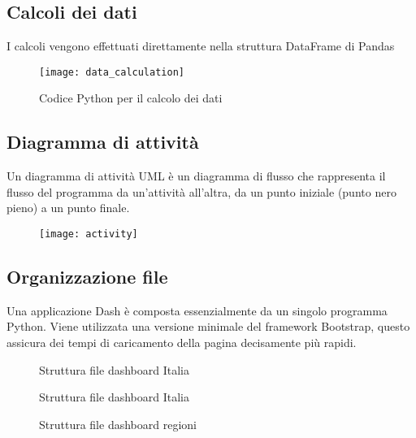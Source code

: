 \subsection{Calcoli dei dati}
I calcoli vengono effettuati direttamente nella struttura DataFrame di Pandas
\begin{figure}[htp]
    \centering
    \texttt{[image: data\_calculation]}
    \caption{Codice Python per il calcolo dei dati}
\end{figure}


\subsection{Diagramma di attività}
Un diagramma di attività UML è un diagramma di flusso che rappresenta il flusso del programma da un'attività all'altra,
da un punto iniziale (punto nero pieno) a un punto finale.

\begin{figure}[htp]
    \centering
    \texttt{[image: activity]}
\end{figure}

\subsection{Organizzazione file}
Una applicazione Dash è composta essenzialmente da un singolo programma Python.
Viene utilizzata una versione minimale del framework Bootstrap\footnotemark, questo assicura dei tempi di caricamento della pagina decisamente più rapidi.

\begin{figure}
\centering
\begin{minipage}{.3\linewidth}
\caption{Struttura file dashboard Italia}
\end{minipage}\hfill
\begin{minipage}{.65\linewidth}
\caption{Struttura file dashboard Italia}
\end{minipage}
\end{figure}


\begin{figure}
\centering
\begin{minipage}{.3\linewidth}
\caption{Struttura file dashboard regioni}
\end{minipage}\hfill
\end{figure}

